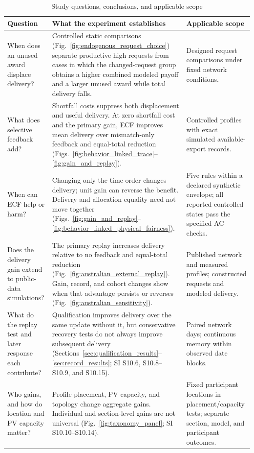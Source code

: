 \documentclass[twoside,twocolumn,9pt]{article}
\begin{document}
\begin{table}[!t]
\caption{Study questions, conclusions, and applicable scope}
\label{tab:experiment_evidence_map}
\centering
\scriptsize
\setlength{\tabcolsep}{3.0pt}
\renewcommand{\arraystretch}{1.13}
\begin{tabularx}{\columnwidth}{@{}>{\raggedright\arraybackslash}p{1.65cm}>{\raggedright\arraybackslash}X>{\raggedright\arraybackslash}p{2.0cm}@{}}
\toprule
Question & What the experiment establishes & Applicable scope \\
\midrule
When does an unused award displace delivery? & Controlled static comparisons
(Fig.~\ref{fig:endogenous_request_choice}) separate productive high requests
from cases in which the changed-request group obtains a higher combined modeled
payoff and a larger unused award while total delivery falls.
& Designed request comparisons under fixed network conditions. \\
What does selective feedback add? & Shortfall costs suppress both displacement
and useful delivery. At zero shortfall cost and the primary gain, ECF improves
mean delivery over mismatch-only feedback and equal-total reduction
(Figs.~\ref{fig:behavior_linked_trace}--\ref{fig:gain_and_replay}).
& Controlled profiles with exact simulated available-export records. \\
When can ECF help or harm? & Changing only the time order changes delivery;
unit gain can reverse the benefit. Delivery and allocation equality need not
move together (Figs.~\ref{fig:gain_and_replay}--\ref{fig:behavior_linked_physical_fairness}).
& Five rules within a declared synthetic envelope; all reported controlled
states pass the specified AC checks. \\
Does the delivery gain extend to public-data simulations? & The primary replay
increases delivery relative to no feedback and equal-total reduction
(Fig.~\ref{fig:australian_external_replay}). Gain, record, and cohort changes
show when that advantage persists or reverses
(Fig.~\ref{fig:australian_sensitivity}). & Published network and measured
profiles; constructed requests and modeled delivery. \\
What do the replay test and later response each contribute? & Qualification
improves delivery over the same update without it, but conservative recovery
tests do not always improve subsequent delivery
(Sections~\ref{sec:qualification_results}--\ref{sec:record_results};
SI S10.6, S10.8--S10.9, and S10.15).
& Paired network days; continuous memory within observed date blocks. \\
Who gains, and how do location and PV capacity matter? & Profile placement,
PV capacity, and topology change aggregate gains. Individual and section-level
gains are not universal (Fig.~\ref{fig:taxonomy_panel}; SI S10.10--S10.14). & Fixed participant locations in placement/capacity tests;
separate section, model, and participant outcomes. \\
\bottomrule
\end{tabularx}
\end{table}
\end{document}
